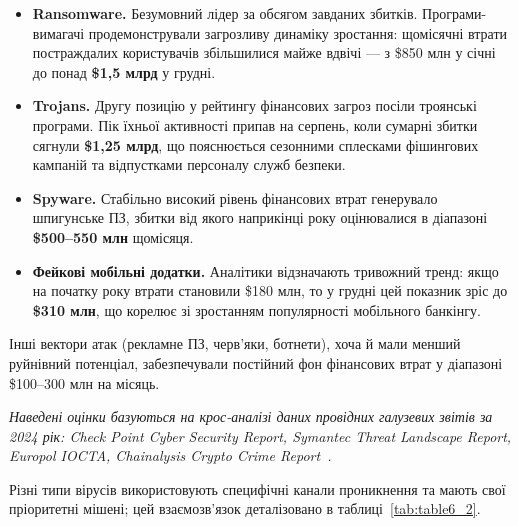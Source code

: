 \begin{itemize}
    \item \textbf{Ransomware.} Безумовний лідер за обсягом завданих збитків. Програми-вимагачі продемонстрували загрозливу динаміку зростання: щомісячні втрати постраждалих користувачів збільшилися майже вдвічі — з \$850 млн у січні до понад \textbf{\$1,5 млрд} у грудні.

    \item \textbf{Trojans.} Другу позицію у рейтингу фінансових загроз посіли троянські програми. Пік їхньої активності припав на серпень, коли сумарні збитки сягнули \textbf{\$1,25 млрд}, що пояснюється сезонними сплесками фішингових кампаній та відпустками персоналу служб безпеки.

    \item \textbf{Spyware.} Стабільно високий рівень фінансових втрат генерувало шпигунське ПЗ, збитки від якого наприкінці року оцінювалися в діапазоні \textbf{\$500--550 млн} щомісяця.

    \item \textbf{Фейкові мобільні додатки.} Аналітики відзначають тривожний тренд: якщо на початку року втрати становили \$180 млн, то у грудні цей показник зріс до \textbf{\$310 млн}, що корелює зі зростанням популярності мобільного банкінгу.
\end{itemize}



Інші вектори атак (рекламне ПЗ, черв'яки, ботнети), хоча й мали менший руйнівний потенціал, забезпечували постійний фон фінансових втрат у діапазоні \$100--300 млн на місяць.

\vspace{0.3cm}
\textit{Наведені оцінки базуються на крос-аналізі даних провідних галузевих звітів за 2024 рік: Check Point Cyber Security Report, Symantec Threat Landscape Report, Europol IOCTA, Chainalysis Crypto Crime Report~\cite{CheckPoint_2024, Symantec_Threat_2024, Europol_IOCTA_2024, Chainalysis_Crypto_2024}.}

Різні типи вірусів використовують специфічні канали проникнення та мають свої пріоритетні мішені; цей взаємозв'язок деталізовано в таблиці~\ref{tab:table6_2}.

